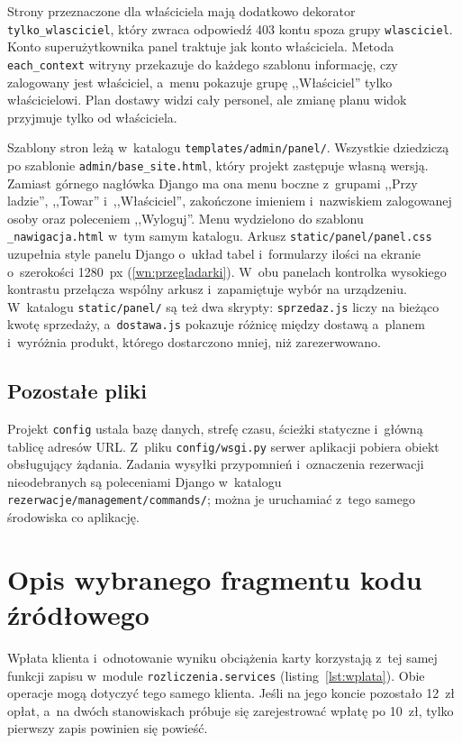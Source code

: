 \documentclass[12pt,a4paper,oneside]{article}
\newcounter{pu}
\begin{document}
Strony przeznaczone dla właściciela mają dodatkowo dekorator \texttt{tylko\_wlasciciel}, który zwraca odpowiedź 403 kontu spoza grupy \texttt{wlasciciel}. Konto superużytkownika panel traktuje jak konto właściciela. Metoda \texttt{each\_context} witryny przekazuje do każdego szablonu informację, czy zalogowany jest właściciel, a~menu pokazuje grupę ,,Właściciel'' tylko właścicielowi. Plan dostawy widzi cały personel, ale zmianę planu widok przyjmuje tylko od właściciela.

Szablony stron leżą w~katalogu \texttt{templates/admin/panel/}. Wszystkie dziedziczą po szablonie \texttt{admin/base\_site.html}, który projekt zastępuje własną wersją. Zamiast górnego nagłówka Django ma ona menu boczne z~grupami ,,Przy ladzie'', ,,Towar'' i~,,Właściciel'', zakończone imieniem i~nazwiskiem zalogowanej osoby oraz poleceniem ,,Wyloguj''. Menu wydzielono do szablonu \texttt{\_nawigacja.html} w~tym samym katalogu. Arkusz \texttt{static/panel/panel.css} uzupełnia style panelu Django o~układ tabel i~formularzy ilości na ekranie o~szerokości 1280~px (\ref{wn:przegladarki}). W~obu panelach kontrolka wysokiego kontrastu przełącza wspólny arkusz i~zapamiętuje wybór na urządzeniu. W~katalogu \texttt{static/panel/} są też dwa skrypty: \texttt{sprzedaz.js} liczy na bieżąco kwotę sprzedaży, a~\texttt{dostawa.js} pokazuje różnicę między dostawą a~planem i~wyróżnia produkt, którego dostarczono mniej, niż zarezerwowano.


\subsection{Pozostałe pliki}

Projekt \texttt{config} ustala bazę danych, strefę czasu, ścieżki statyczne i~główną tablicę adresów URL. Z~pliku \texttt{config/wsgi.py} serwer aplikacji pobiera obiekt obsługujący żądania. Zadania wysyłki przypomnień i~oznaczenia rezerwacji nieodebranych są poleceniami Django w~katalogu \texttt{rezerwacje/management/commands/}; można je uruchamiać z~tego samego środowiska co aplikację.



\clearpage
\section{Opis wybranego fragmentu kodu źródłowego}
\label{ch:kod}
Wpłata klienta i~odnotowanie wyniku obciążenia karty korzystają z~tej samej funkcji zapisu w~module \texttt{rozliczenia.services} (listing~\ref{lst:wplata}). Obie operacje mogą dotyczyć tego samego klienta. Jeśli na jego koncie pozostało 12~zł opłat, a~na dwóch stanowiskach próbuje się zarejestrować wpłatę po 10~zł, tylko pierwszy zapis powinien się powieść.
\end{document}
